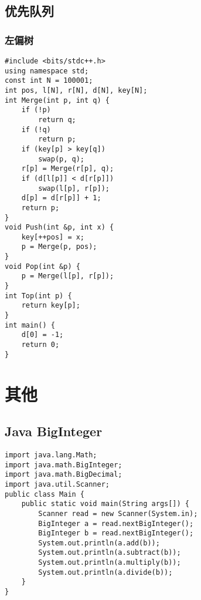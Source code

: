 \documentclass[a4paper]{article}
\begin{document}
\subsection{优先队列}
\subsubsection{左偏树}
\begin{lstlisting}
#include <bits/stdc++.h>
using namespace std;
const int N = 100001;
int pos, l[N], r[N], d[N], key[N];
int Merge(int p, int q) {
    if (!p)
        return q;
    if (!q)
        return p;
    if (key[p] > key[q])
        swap(p, q);
    r[p] = Merge(r[p], q);
    if (d[l[p]] < d[r[p]])
        swap(l[p], r[p]);
    d[p] = d[r[p]] + 1;
    return p;
}
void Push(int &p, int x) {
    key[++pos] = x;
    p = Merge(p, pos);
}
void Pop(int &p) {
    p = Merge(l[p], r[p]);
}
int Top(int p) {
    return key[p];
}
int main() {
    d[0] = -1;
    return 0;
}
\end{lstlisting}
\section{其他}
\subsection{Java BigInteger}
\begin{lstlisting}
import java.lang.Math;
import java.math.BigInteger;
import java.math.BigDecimal;
import java.util.Scanner;
public class Main {
    public static void main(String args[]) {
        Scanner read = new Scanner(System.in);
        BigInteger a = read.nextBigInteger();
        BigInteger b = read.nextBigInteger();
        System.out.println(a.add(b));
        System.out.println(a.subtract(b));
        System.out.println(a.multiply(b));
        System.out.println(a.divide(b));
    }
}
\end{lstlisting}
\end{document}

